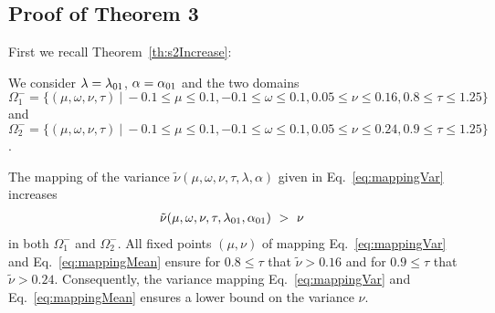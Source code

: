 \documentclass{article}
\newcommand\nunn{{\tilde \nu}}
\renewcommand{\leq}{\leqslant}
\begin{document}
\subsection{Proof of Theorem 3}

First we recall Theorem~\ref{th:s2Increase}:
\begin{theorem*}[Increasing $\nu$]
We consider $\lambda=\lambda_{\rm 01}$, $\alpha=\alpha_{\rm 01}$
and the two domains 
$\Omega_1 ^-=\{(\mu,\omega,\nu,\tau) \ | \ -0.1 \leq \mu \leq 0.1, -0.1 \leq \omega \leq 0.1, 0.05 \leq \nu \leq 0.16, 0.8 \leq \tau \leq 1.25 \}$ 
 and
$\Omega_2 ^-=\{(\mu,\omega,\nu,\tau) \ | \ -0.1 \leq \mu \leq 0.1, -0.1 \leq \omega \leq 0.1, 0.05 \leq \nu \leq 0.24, 0.9 \leq \tau \leq 1.25 \}$ .

The mapping of the variance
$\nunn(\mu,\omega,\nu,\tau,\lambda,\alpha )$  given in Eq.~\eqref{eq:mappingVar} increases
\begin{align}
\nunn(\mu,\omega,\nu,\tau,\lambda_{\rm 01},\alpha_{\rm 01}) \ &> \ \nu 
\end{align}
in both $\Omega_1^-$ and $\Omega_2^-$.
All fixed
points $(\mu,\nu)$ of mapping Eq.~\eqref{eq:mappingVar} and
Eq.~\eqref{eq:mappingMean} ensure for $0.8 \leq \tau$ that
$\nunn>0.16$ 
and for $0.9 \leq \tau$ that $\nunn>0.24$.
Consequently, the variance mapping Eq.~\eqref{eq:mappingVar} and
Eq.~\eqref{eq:mappingMean} ensures a lower bound on the variance $\nu$. 
\end{theorem*}
\end{document}
